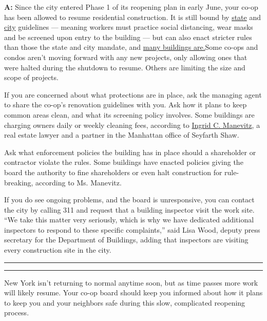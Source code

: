 \textbf{A:} Since the city entered Phase 1 of its reopening plan in
early June, your co-op has been allowed to resume residential
construction. It is still bound by
\href{https://www.governor.ny.gov/sites/governor.ny.gov/files/atoms/files/ConstructionShortGuidelines.pdf}{state}
and
\href{https://www1.nyc.gov/assets/buildings/pdf/restart_enforcement_guidance.pdf}{city}
guidelines --- meaning workers must practice social distancing, wear
masks and be screened upon entry to the building --- but can also enact
stricter rules than those the state and city mandate, and
\href{https://www.nytimes3xbfgragh.onion/2020/07/02/realestate/coronavirus-home-renovations.html}{many
buildings are.}Some co-ops and condos aren't moving forward with any new
projects, only allowing ones that were halted during the shutdown to
resume. Others are limiting the size and scope of projects.

If you are concerned about what protections are in place, ask the
managing agent to share the co-op's renovation guidelines with you. Ask
how it plans to keep common areas clean, and what its screening policy
involves. Some buildings are charging owners daily or weekly cleaning
fees, according to
\href{https://www.seyfarth.com/people/ingrid-c-manevitz.html}{Ingrid C.
Manevitz}, a real estate lawyer and a partner in the Manhattan office of
Seyfarth Shaw.

Ask what enforcement policies the building has in place should a
shareholder or contractor violate the rules. Some buildings have enacted
policies giving the board the authority to fine shareholders or even
halt construction for rule-breaking, according to Ms. Manevitz.

If you do see ongoing problems, and the board is unresponsive, you can
contact the city by calling 311 and request that a building inspector
visit the work site. ``We take this matter very seriously, which is why
we have dedicated additional inspectors to respond to these specific
complaints,'' said Lisa Wood, deputy press secretary for the Department
of Buildings, adding that inspectors are visiting every construction
site in the city.

\begin{center}\rule{0.5\linewidth}{\linethickness}\end{center}

\begin{center}\rule{0.5\linewidth}{\linethickness}\end{center}

New York isn't returning to normal anytime soon, but as time passes more
work will likely resume. Your co-op board should keep you informed about
how it plans to keep you and your neighbors safe during this slow,
complicated reopening process.

